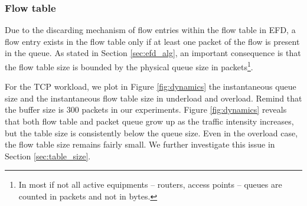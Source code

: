 \documentclass[preprint,12pt]{elsarticle}
\begin{document}

\subsubsection{Flow table}

Due to the discarding mechanism of flow entries within the flow table in EFD, a flow entry exists in the flow table only if at least one packet of the flow is present in the queue. As stated in Section \ref{sec:efd_alg}, an important consequence is that the flow table size is bounded by the physical queue size in packets\footnote{In most if not all active equipments -- routers, access points -- queues are counted in packets and not in bytes.}. %

For the TCP workload, we plot in Figure \ref{fig:dynamics} the instantaneous queue size and the instantaneous flow table size in underload and overload. Remind that the buffer size is 300 packets in our experiments. Figure \ref{fig:dynamics} reveals that both flow table and packet queue grow up as the traffic intensity increases, but the table size is consistently below the queue size. Even in the overload case, the flow table size remains fairly small. We further investigate this issue in Section \ref{sec:table_size}.%
\end{document}
